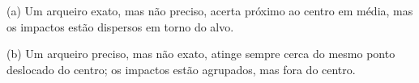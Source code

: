 (a) Um arqueiro exato, mas não preciso, acerta próximo ao centro em média, mas os impactos estão dispersos em torno do alvo.

(b) Um arqueiro preciso, mas não exato, atinge sempre cerca do mesmo ponto deslocado do centro; os impactos estão agrupados, mas fora do centro. 